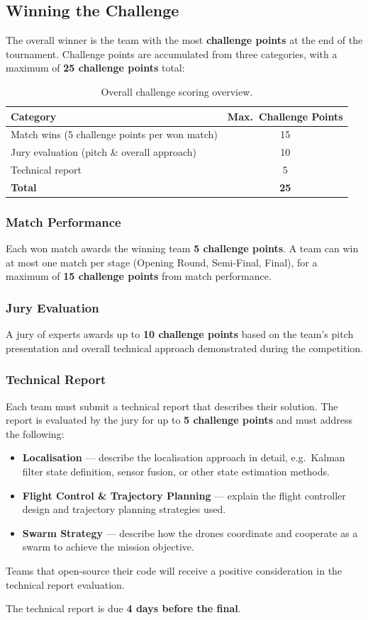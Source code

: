 \subsection{Winning the Challenge}
\label{sec:winning}
The overall winner is the team with the most \textbf{challenge points} at the end of the tournament. Challenge points are accumulated from three categories, with a maximum of \textbf{25 challenge points} total:

\begin{table}[H]
\centering
\begin{tabular}{lc}
\hline
\textbf{Category} & \textbf{Max.\ Challenge Points} \\
\hline
Match wins (5 challenge points per won match) & 15 \\
Jury evaluation (pitch \& overall approach) & 10 \\
Technical report & 5 \\
\hline
\textbf{Total} & \textbf{25} \\
\hline
\end{tabular}
\caption{Overall challenge scoring overview.}
\end{table}

\subsubsection{Match Performance}
Each won match awards the winning team \textbf{5 challenge points}. A team can win at most one match per stage (Opening Round, Semi-Final, Final), for a maximum of \textbf{15 challenge points} from match performance.

\subsubsection{Jury Evaluation}
A jury of experts awards up to \textbf{10 challenge points} based on the team's pitch presentation and overall technical approach demonstrated during the competition.

\subsubsection{Technical Report}
Each team must submit a technical report that describes their solution. The report is evaluated by the jury for up to \textbf{5 challenge points} and must address the following:
\begin{itemize}
	\item{\textbf{Localisation} --- describe the localisation approach in detail, e.g.\ Kalman filter state definition, sensor fusion, or other state estimation methods.}
	\item{\textbf{Flight Control \& Trajectory Planning} --- explain the flight controller design and trajectory planning strategies used.}
	\item{\textbf{Swarm Strategy} --- describe how the drones coordinate and cooperate as a swarm to achieve the mission objective.}
\end{itemize}
Teams that open-source their code will receive a positive consideration in the technical report evaluation.

The technical report is due \textbf{4 days before the final}.
